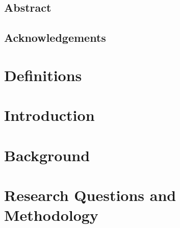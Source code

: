 \documentclass[
  numbers=noenddot,
  english,  %
  a4paper,  %
  twoside,  %
  bibliography=totoc,
  headsepline,
  cleardoublepage=empty,
  parskip=half,
  draft=false
]{scrbook}
\theoremstyle{break}
\begin{document}
\raggedbottom
{}
\Titelblatt

\pagestyle{plain.scrheadings}
\renewcommand*{\chapterpagestyle}{plain.scrheadings}

\section*{Abstract}


\clearpage
\section*{Acknowledgements}


\chapter*{Definitions}
\label{chap:definitions}


\tableofcontents

\listoffigures
\listoftables

\cleardoublepage


\printglossary[type=\acronymtype,title={Abbreviations}]

\cleardoublepage

\ohead[]{\headmark}


\renewcommand*{\chapterpagestyle}{scrplain}
\pagestyle{scrheadings}

\chapter{Introduction}
\label{chap:introduction}


\chapter{Background}
\label{chap:background}


\chapter{Research Questions and Methodology}
\label{chap:methodology}

\end{document}
